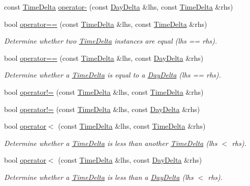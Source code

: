 \begin{DoxyCompactItemize}
\item 
const \hyperlink{structTimeDelta}{Time\-Delta} \hyperlink{structTimeDelta_afa45b09b5e63a55e656879efe36665d8}{operator-\/} (const \hyperlink{structDayDelta}{Day\-Delta} \&lhs, const \hyperlink{structTimeDelta}{Time\-Delta} \&rhs)
\item 
bool \hyperlink{structTimeDelta_a9a4d0c810cfb1ede0c5abd2058ffa880}{operator==} (const \hyperlink{structTimeDelta}{Time\-Delta} \&lhs, const \hyperlink{structTimeDelta}{Time\-Delta} \&rhs)
\begin{DoxyCompactList}\small\item\em Determine whether two \hyperlink{structTimeDelta}{Time\-Delta} instances are equal (lhs == rhs). \end{DoxyCompactList}\item 
bool \hyperlink{structTimeDelta_afe5fa935ba594ec812f1e710249f5e7b}{operator==} (const \hyperlink{structTimeDelta}{Time\-Delta} \&lhs, const \hyperlink{structDayDelta}{Day\-Delta} \&rhs)
\begin{DoxyCompactList}\small\item\em Determine whether a \hyperlink{structTimeDelta}{Time\-Delta} is equal to a \hyperlink{structDayDelta}{Day\-Delta} (lhs == rhs). \end{DoxyCompactList}\item 
bool \hyperlink{structTimeDelta_a34ecf194f14217e5a53721b47b55afea}{operator!=} (const \hyperlink{structTimeDelta}{Time\-Delta} \&lhs, const \hyperlink{structTimeDelta}{Time\-Delta} \&rhs)
\item 
bool \hyperlink{structTimeDelta_a0d25b946241515ced11e26824a518dcd}{operator!=} (const \hyperlink{structTimeDelta}{Time\-Delta} \&lhs, const \hyperlink{structDayDelta}{Day\-Delta} \&rhs)
\item 
bool \hyperlink{structTimeDelta_a46cbd1394d5b9a671a2663d1ec292133}{operator$<$} (const \hyperlink{structTimeDelta}{Time\-Delta} \&lhs, const \hyperlink{structTimeDelta}{Time\-Delta} \&rhs)
\begin{DoxyCompactList}\small\item\em Determine whether a \hyperlink{structTimeDelta}{Time\-Delta} is less than another \hyperlink{structTimeDelta}{Time\-Delta} (lhs $<$ rhs). \end{DoxyCompactList}\item 
bool \hyperlink{structTimeDelta_a29c6cc2df50da56060b21a3cb5223dd8}{operator$<$} (const \hyperlink{structTimeDelta}{Time\-Delta} \&lhs, const \hyperlink{structDayDelta}{Day\-Delta} \&rhs)
\begin{DoxyCompactList}\small\item\em Determine whether a \hyperlink{structTimeDelta}{Time\-Delta} is less than a \hyperlink{structDayDelta}{Day\-Delta} (lhs $<$ rhs). \end{DoxyCompactList}\item 

\end{DoxyCompactItemize}

